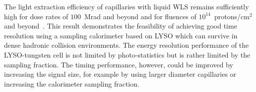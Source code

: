 The light extraction efficiency of capillaries with liquid WLS remains
sufficiently high for dose rates of $100$~Mrad and beyond and for fluences of
$10^{14}$~protons/$\mathrm{cm}^{2}$ and beyond~\cite{shashlik2}. This result
demonstrates the feasibility of achieving good time resolution using a sampling
calorimeter based on LYSO which can survive in dense hadronic collision environments.
The energy resolution performance of the LYSO-tungsten cell is not limited by
photo-statistics but is rather limited by the sampling fraction. The timing
performance, however, could be improved by increasing the signal size, for example by 
using larger diameter capillaries or increasing the calorimeter sampling fraction. 

